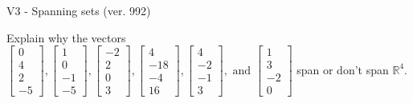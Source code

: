 \begin{exercise}
  \begin{exerciseTitle}V3 - Spanning sets (ver. 992)\end{exerciseTitle}
  \begin{exerciseStatement}
    Explain why the vectors \(\left[\begin{array}{r}
0 \\
4 \\
2 \\
-5
\end{array}\right] , \left[\begin{array}{r}
1 \\
0 \\
-1 \\
-5
\end{array}\right] , \left[\begin{array}{r}
-2 \\
2 \\
0 \\
3
\end{array}\right] , \left[\begin{array}{r}
4 \\
-18 \\
-4 \\
16
\end{array}\right] , \left[\begin{array}{r}
4 \\
-2 \\
-1 \\
3
\end{array}\right] , \text{ and } \left[\begin{array}{r}
1 \\
3 \\
-2 \\
0
\end{array}\right]\) span or don't span \(\mathbb{R}^4\). 
	



\end{exerciseStatement}
\end{exercise}
